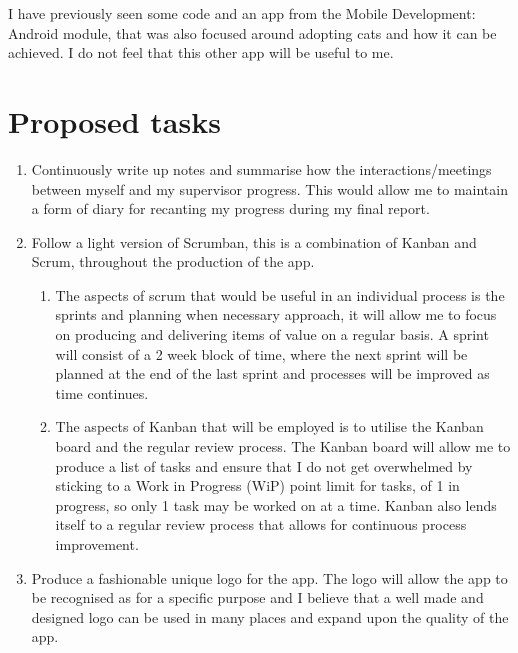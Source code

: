 \documentclass[11pt,fleqn,twoside]{article}
\begin{document}
I have previously seen some code and an app from the Mobile Development: Android module, that was also focused around adopting cats and how it can be achieved. I do not feel that this other app will be useful to me.


\section{Proposed tasks}

\begin{enumerate}
    \item Continuously write up notes and summarise how the interactions/meetings between myself and my supervisor progress. This would allow me to maintain a form of diary for recanting my progress during my final report.
    \item Follow a light version of Scrumban, this is a combination of Kanban and Scrum, throughout the production of the app.
    
        \begin{enumerate}
            \item The aspects of scrum that would be useful in an individual process is the sprints and planning when necessary approach, it will allow me to focus on producing and delivering items of value on a regular basis. A sprint will consist of a 2 week block of time, where the next sprint will be planned at the end of the last sprint and processes will be improved as time continues.
            \item The aspects of Kanban that will be employed is to utilise the Kanban board and the regular review process. The Kanban board will allow me to produce a list of tasks and ensure that I do not get overwhelmed by sticking to a Work in Progress (WiP) point limit for tasks, of 1 in progress, so only 1 task may be worked on at a time. Kanban also lends itself to a regular review process that allows for continuous process improvement.
        \end{enumerate}
    
    \item Produce a fashionable unique logo for the app. The logo will allow the app to be recognised as for a specific purpose and I believe that a well made and designed logo can be used in many places and expand upon the quality of the app.
    

\end{enumerate}
\end{document}
